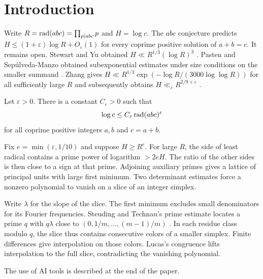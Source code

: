 \section{Introduction}

Write \(R=\operatorname{rad}(abc)=\prod_{p\mid abc}p\) and \(H=\log c\).
The \(abc\) conjecture predicts \(H\le(1+\varepsilon)\log R+O_\varepsilon(1)\)
for every coprime positive solution of \(a+b=c\). It remains open.
Stewart and Yu obtained \(H\ll R^{1/3}(\log R)^3\)
\cite[Theorem~1]{SY2001}. Pasten and Sep\'ulveda-Manzo obtained
subexponential estimates under size conditions on the smaller summand
\cite[Theorems~1.2 and~1.3]{PastenSep}. Zhang gives
\(H\ll R^{1/3}\exp(-\log R/(3000\log\log R))\) for all sufficiently large
\(R\) \cite[Theorem~1]{ZhangThird} and subsequently obtains
\(H\ll_\varepsilon R^{2/9+\varepsilon}\) \cite[Theorem~1.1]{Z29}.

\begin{theorem}\label{thm:main}
Let \(\varepsilon>0\). There is a constant \(C_\varepsilon>0\) such that
\[
       \log c\le C_\varepsilon\operatorname{rad}(abc)^\varepsilon
\]
for all coprime positive integers \(a,b\) and \(c=a+b\).
\end{theorem}

Fix \(e=\min(\varepsilon,1/10)\) and suppose \(H\ge R^e\).
For large \(R\), the side of least radical contains a prime power of logarithm \(>2eH\).
The ratio of the other sides is then close to a sign at that prime.
Adjoining auxiliary primes gives a lattice of principal units with large first minimum.
Two determinant estimates force a nonzero polynomial to vanish on a slice of an integer simplex.

Write \(\lambda\) for the slope of the slice.
The first minimum excludes small denominators for its Fourier frequencies.
Steuding and Technau's prime estimate locates a prime \(q\) with
\(q\lambda\) close to \((0,1/m,\ldots,(m-1)/m)\)
\cite[Theorem~3]{SteudingTechnau}.
In each residue class modulo \(q\), the slice thus contains consecutive colors of a smaller simplex.
Finite differences give interpolation on those colors.
Lucas's congruence lifts interpolation to the full slice, contradicting the vanishing polynomial.

The use of AI tools is described at the end of the paper.

